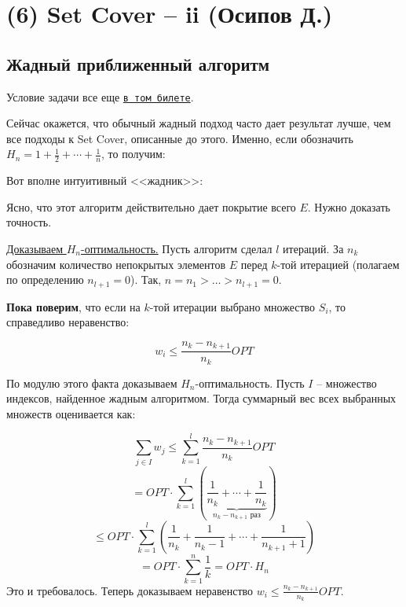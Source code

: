 \section{(6) Set Cover -- ii (Осипов Д.)}
\subsection{Жадный приближенный алгоритм}
Условие задачи все еще \hyperlink{setcover}{\texttt{в том билете}}.

Сейчас окажется, что обычный жадный подход часто дает результат лучше, чем все подходы к Set Cover, описанные до этого. Именно, если обозначить $H_n = 1 + \frac{1}{2} + \cdots + \frac{1}{n}$, то получим:


Вот вполне интуитивный <<жадник>>:

\begin{algorithm}[H]
	\DontPrintSemicolon
\end{algorithm}

Ясно, что этот алгоритм действительно дает покрытие всего $E$. Нужно доказать точность.

\underline{Доказываем $H_n$-оптимальность.} Пусть алгоритм сделал $l$ итераций. За $n_k$ обозначим количество непокрытых элементов $E$ перед $k$-той итерацией (полагаем по определению $n_{l+1}=0$). Так, $n = n_1 > \ldots > n_{l+1} = 0$.

\textbf{Пока поверим}, что если на $k$-той итерации выбрано множество $S_i$, то справедливо неравенство:

$$w_i \leq \frac{n_k - n_{k+1}}{n_k}OPT$$

По модулю этого факта доказываем $H_n$-оптимальность. Пусть $I$ -- множество индексов, найденное жадным алгоритмом. Тогда суммарный вес всех выбранных множеств оценивается как:

$$\sum_{j\in I}w_j \leq \sum_{k=1}^l\frac{n_k-n_{k+1}}{n_k} OPT$$
$$ = OPT\cdot\sum_{k=1}^l\left(\underbrace{\frac{1}{n_k} + \cdots + \frac{1}{n_k}}_{n_k-n_{k+1}\text{ раз}}\right)$$
$$ \leq OPT \cdot\sum_{k=1}^l\left(\frac{1}{n_k} + \frac{1}{n_k - 1} + \cdots + \frac{1}{n_{k+1}+1}\right)$$
$$ = OPT\cdot\sum_{k=1}^n\frac{1}{k} = OPT\cdot H_n$$
Это и требовалось. Теперь доказываем неравенство $w_i \leq \frac{n_k - n_{k+1}}{n_k}OPT$.

